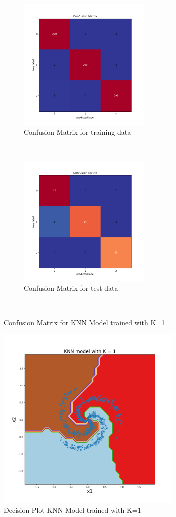 \begin{figure}[!ht]
    \centering
    \begin{subfigure}[t]{0.5\textwidth}
        \centering
        \includegraphics[height=2.5in]{Dataset_1b/K_1_cmatrix_train_data.png}
        \caption{Confusion Matrix for training data}
    \end{subfigure}%
    ~ 
    \begin{subfigure}[t]{0.5\textwidth}
        \centering
        \includegraphics[height=2.5in]{Dataset_1b/K_1_cmatrix_test_data.png}
        \caption{Confusion Matrix for test data}
    \end{subfigure}%
    ~
    \caption{Confusion Matrix for KNN Model trained with K=1}
    \label{fig:13}
\end{figure}

\begin{figure}[!ht]
    \centering
    \includegraphics[height=3.5in]{Dataset_1b/K_1_decision_plot.png}
    \caption{Decision Plot KNN Model trained with K=1}
    \label{fig:14}
\end{figure}

